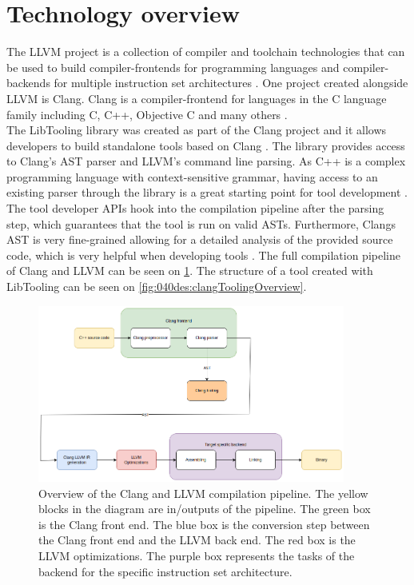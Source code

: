 \section{Technology overview}
The LLVM project is a collection of compiler and toolchain technologies that can be used to build compiler-frontends for programming languages and compiler-backends for multiple instruction set architectures \cite{llvmLLVMCompilerInfrastructure}.
One project created alongside LLVM is Clang. Clang is a compiler-frontend for languages in the C language family including C, C++, Objective C and many others \cite{clangClangLanguageFamily}.\\
The LibTooling library was created as part of the Clang project and it allows developers to build standalone tools based on Clang \cite{llvmLibToolingClang17}. 
The library provides access to Clang's AST parser and LLVM's command line parsing. As C++ is a complex programming language with context-sensitive grammar, having access to an existing parser through the library is a great starting point for tool development \cite{swarnimProblemsPainsParsing}. The tool developer APIs hook into the compilation pipeline after the parsing step, which guarantees that the tool is run on valid ASTs. Furthermore, Clangs AST is very fine-grained allowing for a detailed analysis of the provided source code, which is very helpful when developing tools \cite{clangIntroductionClangAST}. The full compilation pipeline of Clang and LLVM can be seen on \cref{fig:040des:llvmToolchainOverview}. The structure of a tool created with LibTooling can be seen on \cref{fig:040des:clangToolingOverview}.

\begin{figure}[H]
    \centering
    \includegraphics[width=0.9\textwidth]{figs/040des/compilation_overview.png}
    \caption{Overview of the Clang and LLVM compilation pipeline. The yellow blocks in the diagram are in/outputs of the pipeline. The green box is the Clang front end. The blue box is the conversion step between the Clang front end and the LLVM back end. The red box is the LLVM optimizations. The purple box represents the tasks of the backend for the specific instruction set architecture.}
    \label{fig:040des:llvmToolchainOverview}
\end{figure}

